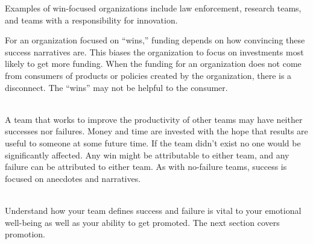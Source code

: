 Examples of win-focused organizations include law enforcement, research teams, and teams with a responsibility for innovation. 

For an organization focused on ``wins,'' funding depends on how convincing these success narratives are. This biases the organization to focus on investments most likely to get more funding. When the funding for an organization does not come from consumers of products or policies created by the organization, there is a disconnect. The ``wins'' may not be helpful to the consumer.


\ \\

A team that works to improve the productivity of other teams may have neither successes nor failures. Money and time are invested with the hope that results are useful to someone at some future time. If the team didn't exist no one would be significantly affected. Any win might be attributable to either team, and any failure can be attributed to either team. As with no-failure teams, success is focused on anecdotes and narratives. 

\ \\

Understand how your team defines success and failure is vital to your emotional well-being as well as your ability to get promoted. The next section covers promotion.